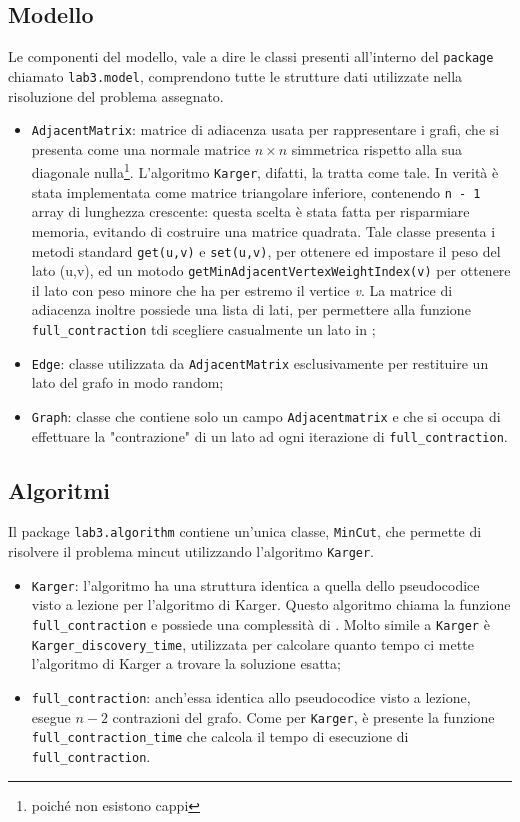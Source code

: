 \subsection{Modello}
Le componenti del modello, vale a dire le classi presenti all'interno del \texttt{package} chiamato \texttt{lab3.model}, comprendono tutte le strutture dati utilizzate nella risoluzione del problema assegnato. 
\begin{itemize}
	\item \label{adjmat}\texttt{AdjacentMatrix}: matrice di adiacenza usata per rappresentare i grafi, che si presenta come una normale matrice $n\times n$ simmetrica rispetto alla sua diagonale nulla\footnote{poiché non esistono cappi}. L'algoritmo \texttt{Karger}, difatti, la tratta come tale. In verità è stata implementata come matrice triangolare inferiore, contenendo \texttt{n - 1} array di lunghezza crescente: questa scelta è stata fatta per risparmiare memoria, evitando di costruire una matrice quadrata. Tale classe presenta i metodi standard \texttt{get(u,v)} e \texttt{set(u,v)}, per ottenere ed impostare il peso del lato (u,v), ed un motodo \texttt{getMinAdjacentVertexWeightIndex(v)} per ottenere il lato con peso minore che ha per estremo il vertice \textit{v}. La matrice di adiacenza inoltre possiede una lista di lati, per permettere alla funzione \texttt{full\_contraction} tdi scegliere casualmente un lato in ;
	\item \texttt{Edge}: classe utilizzata da \texttt{AdjacentMatrix} esclusivamente per restituire un lato del grafo in modo random;
	\item \texttt{Graph}: classe che contiene solo un campo \texttt{Adjacentmatrix} e che si occupa di effettuare la "contrazione" di un lato ad ogni iterazione di \texttt{full\_contraction}.
\end{itemize} 

\subsection{Algoritmi}
Il package \texttt{lab3.algorithm} contiene un'unica classe, \texttt{MinCut}, che permette di risolvere il problema mincut utilizzando l'algoritmo \texttt{Karger}.
\begin{itemize}
	\item \texttt{Karger}: l'algoritmo ha una struttura identica a quella dello pseudocodice visto a lezione per l'algoritmo di Karger. Questo algoritmo chiama la funzione \texttt{full\_contraction} e possiede una complessità di . Molto simile a \texttt{Karger} è \texttt{Karger\_discovery\_time}, utilizzata per calcolare quanto tempo ci mette l'algoritmo di Karger a trovare la soluzione esatta;
	\item \texttt{full\_contraction}: anch'essa identica allo pseudocodice visto a lezione, esegue $n-2$ contrazioni del grafo. Come per \texttt{Karger}, è presente la funzione \texttt{full\_contraction\_time} che calcola il tempo di esecuzione di \texttt{full\_contraction}.
\end{itemize}

